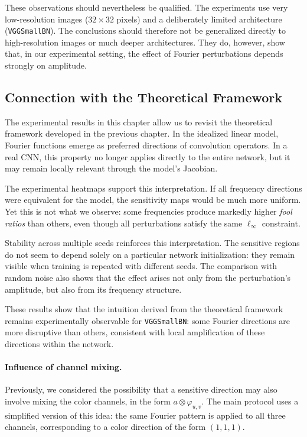 These observations should nevertheless be qualified. The experiments use
very low-resolution images ($32\times32$ pixels) and a deliberately limited architecture
(\texttt{VGGSmallBN}). The conclusions should therefore not be generalized directly to
high-resolution images or much deeper architectures. They do, however, show that,
in our experimental setting, the effect of Fourier perturbations depends strongly on amplitude.

\subsection{Connection with the Theoretical Framework}
\label{subsec:discussion_lien_cadre_theorique}

The experimental results in this chapter allow us to revisit the theoretical framework
developed in the previous chapter. In the idealized linear model, Fourier functions emerge
as preferred directions of convolution operators. In a real CNN, this property
no longer applies directly to the entire network, but it may remain locally relevant through
the model's Jacobian.

The experimental heatmaps support this interpretation. If all frequency directions
were equivalent for the model, the sensitivity maps would be much more uniform. Yet this
is not what we observe: some frequencies produce markedly higher \textit{fool ratios}
than others, even though all perturbations satisfy the same $\ell_\infty$ constraint.

Stability across multiple seeds reinforces this interpretation. The sensitive regions do not seem to depend
solely on a particular network initialization: they remain visible when training is
repeated with different seeds. The comparison with random noise also shows that the effect
arises not only from the perturbation's amplitude, but also from its frequency structure.

These results show that the intuition derived from the theoretical framework remains
experimentally observable for \texttt{VGGSmallBN}: some Fourier directions are more disruptive than others,
consistent with local amplification of these directions within the network.

\paragraph{Influence of channel mixing.}

Previously, we considered the possibility that a sensitive direction may also involve mixing
the color channels, in the form $a \otimes \varphi_{u,v}$. The main protocol uses a simplified version of
this idea: the same Fourier pattern is applied to all three channels, corresponding to a
color direction of the form $(1,1,1)$.

